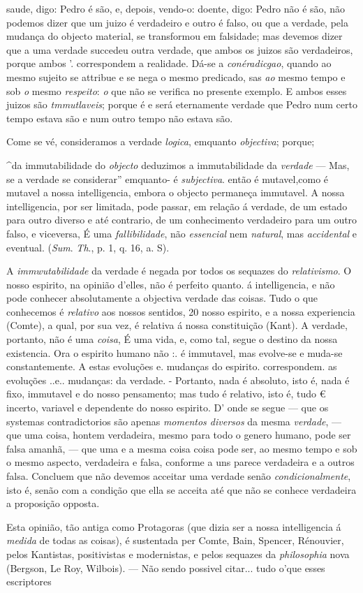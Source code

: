 saude, digo: Pedro é são, e, depois, vendo-o: doente, digo: Pedro não é são, não podemos dizer que um juizo é verdadeiro e outro é falso, ou que a verdade, pela mudança do objecto material, se transformou em falsidade; mas devemos dizer que a uma verdade succedeu outra verdade, que ambos os juizos são verdadeiros, porque ambos '. correspondem a realidade. Dá-se a \emph{conéradicgao}, quando ao mesmo sujeito se attribue e se nega o mesmo predicado, sas \emph{ao} mesmo tempo e sob \emph{o} mesmo \emph{respeito}: \emph{o} que não se verifica no presente exemplo. E ambos esses juizos são \emph{tmmutlaveis}; porque é e será eternamente verdade que Pedro num certo tempo estava são e num outro tempo não estava são.\par Come se vé, consideramos a verdade \emph{logica}, emquanto \emph{objectiva}; porque;\par \textasciicircum{}da immutabilidade do \emph{objecto} deduzimos a immutabilidade da \emph{verdade} --- Mas, se a verdade se considerar” emquanto- é \emph{subjectiva}. então é mutavel,como é mutavel a nossa intelligencia, embora o objecto permaneça immutavel. A nossa intelligencia, por ser limitada, pode passar, em relação á verdade, de um estado para outro diverso e até contrario, de um conhecimento verdadeiro para um outro falso, e viceversa, É uma \emph{fallibilidade}, não \emph{essencial} nem \emph{natural}, mas \emph{accidental} e eventual. (\emph{Sum}. \emph{Th}., p. 1, q. 16, a. S).\par A \emph{immwutabilidade} da verdade é negada por todos os sequazes do \emph{relativismo}. O nosso espirito, na opinião d'elles, não é perfeito quanto. á intelligencia, e não pode conhecer absolutamente a objectiva verdade das coisas. Tudo o que conhecemos é \emph{relativo} aos nossos sentidos, 20 nosso espirito, e a nossa experiencia (Comte), a qual, por sua vez, é relativa á nossa constituição (Kant). A verdade, portanto, não é uma \emph{coisa}, É uma vida, e, como tal, segue o destino da nossa existencia. Ora o espirito humano não :. é immutavel, mas evolve-se e muda-se constantemente. A estas evoluções e. mudanças do espirito. correspondem. as evoluções ..e.. mudanças: da verdade. - Portanto, nada é absoluto, isto é, nada é fixo, immutavel e do nosso pensamento; mas tudo é relativo, isto é, tudo € incerto, variavel e dependente do nosso espirito. D' onde se segue --- que os systemas contradictorios são apenas \emph{momentos diversos} da mesma \emph{verdade}, --- que uma coisa, hontem verdadeira, mesmo para todo o genero humano, pode ser falsa amanhã, --- que uma e a mesma coisa coisa pode ser, ao mesmo tempo e sob o mesmo aspecto, verdadeira e falsa, conforme a uns parece verdadeira e a outros falsa. Concluem que não devemos acceitar uma verdade senão \emph{condicionalmente}, isto é, senão com a condição que ella se acceita até que não se conhece verdadeira a proposição opposta.\par Esta opinião, tão antiga como Protagoras (que dizia ser a nossa intelligencia á \emph{medida} de todas as coisas), é sustentada per Comte, Bain, Spencer, Rénouvier, pelos Kantistas, positivistas e modernistas, e pelos sequazes da \emph{philosophia} nova (Bergson, Le Roy, Wilbois). --- Não sendo possivel citar... tudo o'que esses escriptores 